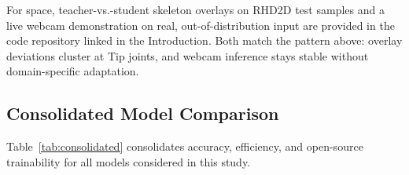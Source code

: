 \documentclass[11pt,conference,a4paper]{APSIPA2026}
\begin{document}

For space, teacher-vs.-student skeleton overlays on RHD2D test
samples and a live webcam demonstration on real, out-of-distribution
input are provided in the code repository linked in the Introduction.
Both match the pattern above: overlay deviations cluster at Tip
joints, and webcam inference stays stable without domain-specific
adaptation.

\subsection{Consolidated Model Comparison}
\label{sec:summary_table}

Table~\ref{tab:consolidated} consolidates accuracy, efficiency,
and open-source trainability for all models considered in this
study.
\end{document}
